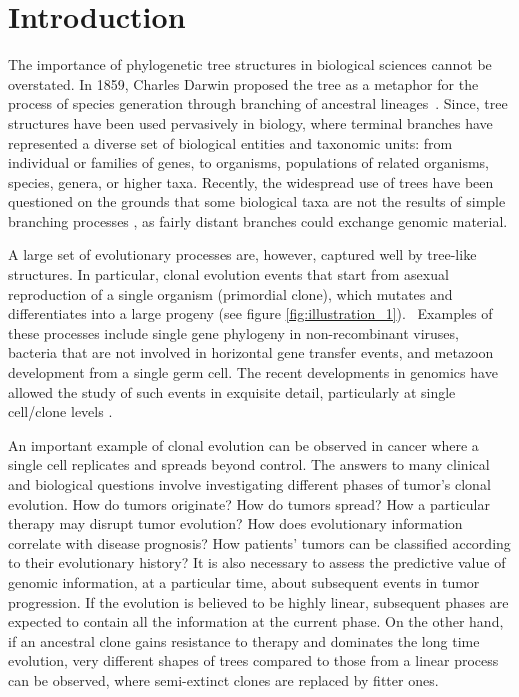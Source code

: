 \documentclass[a4paper,11pt]{article}
\begin{document}
\tableofcontents


\section{Introduction}

The importance of phylogenetic tree structures in biological sciences cannot be overstated.
In 1859, Charles Darwin proposed the tree as a metaphor for the process of species generation through branching of ancestral lineages~\cite{darwin1859origin}.
Since, tree structures have been used pervasively in biology, where terminal branches have represented a diverse set of biological entities and taxonomic units: from individual or families of genes, to organisms, populations of related organisms, species, genera, or higher taxa.
Recently, the widespread use of trees have been questioned on the grounds that some biological taxa are not the results of simple branching processes \cite{doolittle1999phylogenetic, chan2013topology}, as fairly distant branches could exchange genomic material.

A large set of evolutionary processes are, however, captured well by tree-like structures.
In particular, clonal evolution events that start from asexual reproduction of a single organism (primordial clone), which mutates and differentiates into a large progeny (see figure \ref{fig:illustration_1}).~\cite{khiabanian2014viral}
Examples of these processes include single gene phylogeny in non-recombinant viruses, bacteria that are not involved in horizontal gene transfer events, and metazoon development from a single germ cell.
The recent developments in genomics have allowed the study of such events in exquisite detail, particularly at single cell/clone levels \cite{navin2011tumour, shalek2013single, eirew2014dynamics}.

An important example of clonal evolution can be observed in cancer where a single cell replicates and spreads beyond control.
The answers to many clinical and biological questions involve investigating different phases of tumor's clonal evolution.
How do tumors originate?
How do tumors spread?
How a particular therapy may disrupt tumor evolution?
How does evolutionary information correlate with disease prognosis?
How patients' tumors can be classified according to their evolutionary history?
It is also necessary to assess the predictive value of genomic information, at a particular time, about subsequent events in tumor progression.
If the evolution is believed to be highly linear, subsequent phases are expected to contain all the information at the current phase.
On the other hand, if an ancestral clone gains resistance to therapy and dominates the long time evolution, very different shapes of trees compared to those from a linear process can be observed, where semi-extinct clones are replaced by fitter ones.
\end{document}

